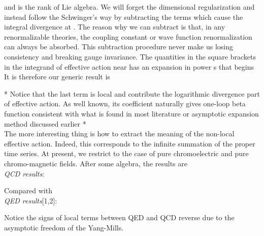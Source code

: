 \documentclass[a4paper,12 pt]{article}
\begin{document}
\begin{center}
\coordHE{}
\end{center}
and \myHighlight{$ \rho $}\coordHE{} is the rank of Lie algebra.
 We will forget the dimensional regularization and instead
follow the Schwinger's way by subtracting the terms which cause
the integral divergence at \coordHE{}. The reason why we
can subtract is that, in any renormalizable theories, the coupling
constant or wave function renormalization can always be absorbed.
This subtraction procedure never make us losing consistency and
breaking gauge invariance. The quantities in the square brackets
in the integrand of effective action near \coordHE{} has an expansion
in power s that begins \coordHE{} It is therefore our generic result is
\begin{center}
\coordHE{}
\end{center}

* Notice that the last term is local and contribute the logarithmic
divergence part of effective action. As well known, its
coefficient naturally gives one-loop beta function consistent with
what is found in most literature or asymptotic expansion method
discussed earlier *
\\
The more interesting thing is how to extract the meaning of the
non-local effective action. Indeed, this corresponds to the
infinite summation of the proper time series. At present, we
restrict to the case of pure chromoelectric and pure
chromo-magnetic fields. After some algebra, the results are
\\
\emph{QCD results}:
\begin{center}
\coordHE{}
\end{center}
\begin{center}
\coordHE{}
\end{center}
Compared with
\\
\emph{QED results}[1,2]:
\begin{center}
\coordHE{}
\end{center}
\begin{center}
\coordHE{}
\end{center}
Notice the signs of local terms between QED and QCD reverse due to
the asymptotic freedom of the Yang-Mills.
\end{document}
